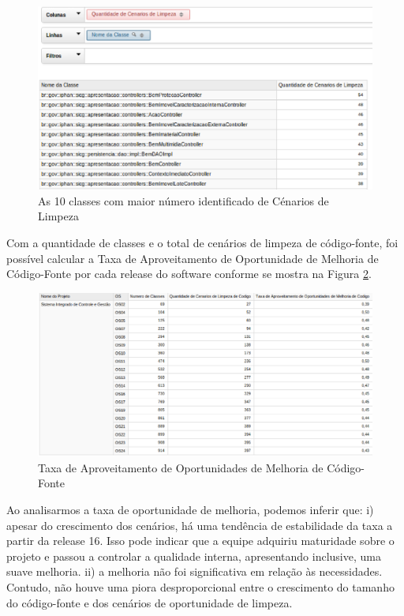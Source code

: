 \begin{figure}[ht!]
\centering
\includegraphics[keepaspectratio=true,scale=0.52]{figuras/10-best.eps}
\caption{As 10 classes com maior número identificado de Cénarios de Limpeza}
\label{fig:worst-10-cenarios}
\end{figure}
\FloatBarrier

Com a quantidade de classes e o total de cenários de limpeza de código-fonte, foi possível calcular a Taxa de Aproveitamento de Oportunidade de Melhoria de Código-Fonte por cada release do software conforme se mostra na Figura \ref{fig:taxa-cenarios}.

\begin{figure}[H]
\centering
\includegraphics[keepaspectratio=true,scale=0.35]{figuras/taxa-parcial.eps}
\caption{Taxa de Aproveitamento de Oportunidades de Melhoria de Código-Fonte}
\label{fig:taxa-cenarios}
\end{figure}
\FloatBarrier

Ao analisarmos a taxa de oportunidade de melhoria, podemos inferir que: i) apesar do crescimento dos cenários, há uma tendência de estabilidade da taxa a partir da release 16. Isso pode indicar que a equipe adquiriu maturidade sobre o projeto e passou a controlar a qualidade interna, apresentando inclusive, uma suave melhoria.  ii) a melhoria não foi significativa em relação às necessidades. Contudo, não houve uma piora desproporcional entre o crescimento do tamanho do código-fonte e dos cenários de oportunidade de limpeza.


